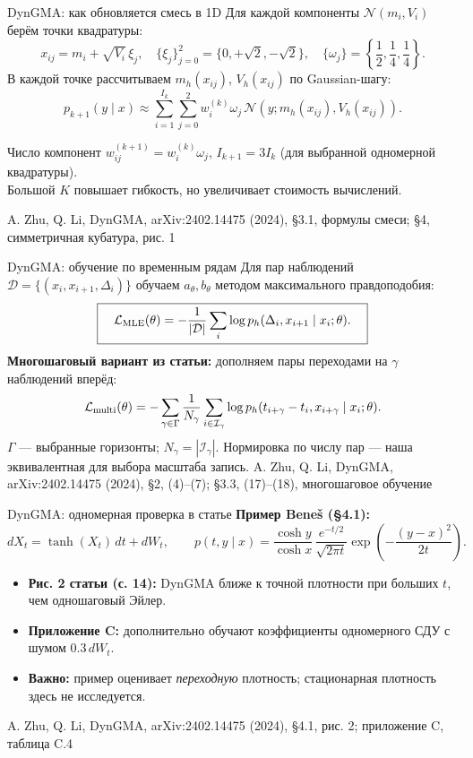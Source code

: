 \documentclass[10pt,aspectratio=169]{beamer}
\newcommand{\dynsrc}[1]{\vfill{\tiny\color{graytext}A. Zhu, Q. Li, DynGMA, arXiv:2402.14475 (2024), #1}}
\begin{document}
\begin{frame}{DynGMA: как обновляется смесь в 1D}
\vspace{0.04cm}
Для каждой компоненты $\mathcal N(m_i,V_i)$ берём точки квадратуры:
\[
 x_{ij}=m_i+\sqrt{V_i}\,\xi_j,
 \quad \{\xi_j\}_{j=0}^{2}=\{0,+\sqrt2,-\sqrt2\},
 \quad\{\omega_j\}=\left\{\frac12,\frac14,\frac14\right\}.
\]
\vspace{0.10cm}
В каждой точке рассчитываем $m_h(x_{ij})$, $V_h(x_{ij})$ по Gaussian-шагу:
\[
\boxed{\quad p_{k+1}(y\mid x)\approx
\sum_{i=1}^{I_k}\sum_{j=0}^{2}w_i^{(k)}\omega_j\,
\mathcal N\!\left(y;m_h(x_{ij}),V_h(x_{ij})\right).\quad}
\]
\vspace{0.10cm}
\begin{block}{Число компонент}
$w_{ij}^{(k+1)}=w_i^{(k)}\omega_j$,\quad
$I_{k+1}=3I_k$ (для выбранной одномерной квадратуры).\\[0.07cm]
Большой $K$ повышает гибкость, но увеличивает стоимость вычислений.
\end{block}
\dynsrc{\S 3.1, формулы смеси; \S 4, симметричная кубатура, рис. 1}
\end{frame}

\begin{frame}{DynGMA: обучение по временным рядам}
\vspace{0.09cm}
Для пар наблюдений $\mathcal D=\{(x_i,x_{i+1},\Delta_i)\}$ обучаем $a_\theta,b_\theta$ методом максимального правдоподобия:
\[
\boxed{\quad\mathcal L_{\rm MLE}(\theta)=
-\frac{1}{|\mathcal D|}\sum_{i}\log p_h(\Delta_i,x_{i+1}\mid x_i;\theta).\quad}
\]
\vspace{0.13cm}
\textbf{Многошаговый вариант из статьи:} дополняем пары переходами на $\gamma$ наблюдений вперёд:
\[
\mathcal L_{\rm multi}(\theta)=-\sum_{\gamma\in\Gamma}
\frac{1}{N_\gamma}\sum_{i\in\mathcal I_\gamma}
\log p_h(t_{i+\gamma}-t_i,x_{i+\gamma}\mid x_i;\theta).
\]
\vspace{0.10cm}
\small $\Gamma$ --- выбранные горизонты; $N_\gamma=|\mathcal I_\gamma|$. Нормировка по числу пар --- наша эквивалентная для выбора масштаба запись.
\dynsrc{\S 2, (4)--(7); \S 3.3, (17)--(18), многошаговое обучение}
\end{frame}

\begin{frame}{DynGMA: одномерная проверка в статье}
\vspace{0.09cm}
\textbf{Пример Bene\v{s} (\S 4.1):}
\[
 dX_t=\tanh(X_t)\,dt+dW_t,\qquad
 \boxed{p(t,y\mid x)=\frac{\cosh y}{\cosh x}\,
 \frac{e^{-t/2}}{\sqrt{2\pi t}}\exp\!\left(-\frac{(y-x)^2}{2t}\right).}
\]
\vspace{0.09cm}
\begin{itemize}\setlength\itemsep{0.15cm}
\item \textbf{Рис. 2 статьи (с. 14):} DynGMA ближе к точной плотности при больших $t$, чем одношаговый Эйлер.
\item \textbf{Приложение C:} дополнительно обучают коэффициенты одномерного СДУ с шумом $0.3\,dW_t$.
\item \textbf{Важно:} пример оценивает \emph{переходную} плотность; стационарная плотность здесь не исследуется.
\end{itemize}
\dynsrc{\S 4.1, рис. 2; приложение C, таблица C.4}
\end{frame}
\end{document}
